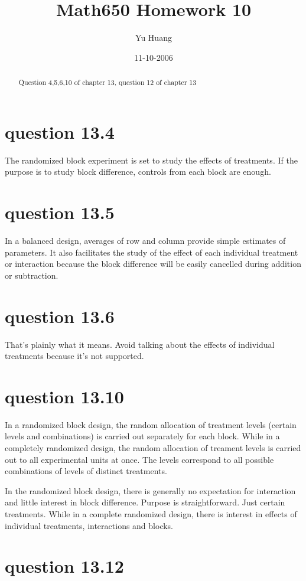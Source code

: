 \documentclass[a4paper,10pt]{article}
\title{Math650 Homework 10}
\author{Yu Huang}
\date{11-10-2006}
\begin{document}
\maketitle

\begin{abstract}
Question 4,5,6,10 of chapter 13, question 12 of chapter 13
\end{abstract}

\section{question 13.4}
The randomized block experiment is set to study the effects of treatments. If the purpose is to study block difference, controls from each block are enough.

\section{question 13.5}
In a balanced design, averages of row and column provide simple estimates of parameters. It also facilitates the study of the effect of each individual treatment or interaction because the block difference will be easily cancelled during addition or subtraction.

\section{question 13.6}
That's plainly what it means. Avoid talking about the effects of individual treatments because it's not supported.

\section{question 13.10}
In a randomized block design, the random allocation of treatment levels (certain levels and combinations) is carried out separately for each block. While in a completely randomized design, the random allocation of treament levels is carried out to all experimental units at once. The levels correspond to all possible combinations of levels of distinct treatments.

In the randomized block design, there is generally no expectation for interaction and little interest in block difference. Purpose is straightforward. Just certain treatments. While in a complete randomized design, there is interest in effects of individual treatments,  interactions and blocks.

\section{question 13.12}
\end{document}
